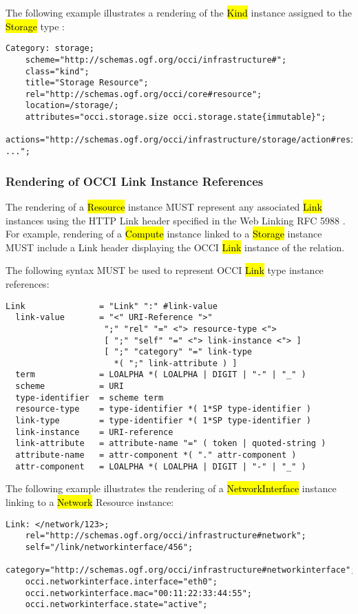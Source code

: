 \documentclass[10pt,a4paper]{article}
\begin{document}
The following example illustrates a rendering of the \hl{Kind}
instance assigned to the \hl{Storage} type \cite{occi:infrastructure}:

\begin{verbatim}
Category: storage;
    scheme="http://schemas.ogf.org/occi/infrastructure#";
    class="kind";
    title="Storage Resource";
    rel="http://schemas.ogf.org/occi/core#resource";
    location=/storage/;
    attributes="occi.storage.size occi.storage.state{immutable}";
    actions="http://schemas.ogf.org/occi/infrastructure/storage/action#resize ...";
\end{verbatim}

\subsubsection{Rendering of OCCI Link Instance References}
The rendering of a \hl{Resource} instance \cite{occi:core} MUST
represent any associated \hl{Link} instances using the HTTP Link
header specified in the Web Linking RFC 5988 \cite{rfc5988}.  For
example, rendering of a \hl{Compute} instance linked to a \hl{Storage}
instance MUST include a Link header displaying the OCCI \hl{Link}
instance of the relation.

The following syntax MUST be used to represent OCCI \hl{Link} type
instance references:

\begin{verbatim}
Link               = "Link" ":" #link-value
  link-value       = "<" URI-Reference ">"
                    ";" "rel" "=" <"> resource-type <">
                    [ ";" "self" "=" <"> link-instance <"> ]
                    [ ";" "category" "=" link-type
                      *( ";" link-attribute ) ]
  term             = LOALPHA *( LOALPHA | DIGIT | "-" | "_" )
  scheme           = URI
  type-identifier  = scheme term
  resource-type    = type-identifier *( 1*SP type-identifier )
  link-type        = type-identifier *( 1*SP type-identifier )
  link-instance    = URI-reference
  link-attribute   = attribute-name "=" ( token | quoted-string )
  attribute-name   = attr-component *( "." attr-component )
  attr-component   = LOALPHA *( LOALPHA | DIGIT | "-" | "_" )
\end{verbatim}

The following example illustrates the rendering of a
\hl{NetworkInterface} \cite{occi:infrastructure} instance linking to a
\hl{Network} Resource instance:

\begin{verbatim}
Link: </network/123>;
    rel="http://schemas.ogf.org/occi/infrastructure#network";
    self="/link/networkinterface/456";
    category="http://schemas.ogf.org/occi/infrastructure#networkinterface";
    occi.networkinterface.interface="eth0";
    occi.networkinterface.mac="00:11:22:33:44:55";
    occi.networkinterface.state="active";
\end{verbatim}
\end{document}
